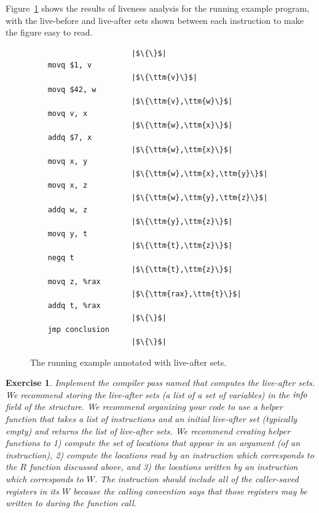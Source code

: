 \documentclass[11pt]{book}
\newtheorem{exercise}[theorem]{Exercise}
\begin{document}
Figure~\ref{fig:live-eg} shows the results of liveness analysis for
the running example program, with the live-before and live-after sets
shown between each instruction to make the figure easy to read.

\begin{figure}[tp]
\hspace{20pt}
\begin{minipage}{0.45\textwidth}
\begin{lstlisting}
                       |$\{\}$|    
    movq $1, v
                       |$\{\ttm{v}\}$|    
    movq $42, w
                       |$\{\ttm{v},\ttm{w}\}$|    
    movq v, x
                       |$\{\ttm{w},\ttm{x}\}$|    
    addq $7, x
                       |$\{\ttm{w},\ttm{x}\}$|    
    movq x, y
                       |$\{\ttm{w},\ttm{x},\ttm{y}\}$|    
    movq x, z
                       |$\{\ttm{w},\ttm{y},\ttm{z}\}$|    
    addq w, z
                       |$\{\ttm{y},\ttm{z}\}$|    
    movq y, t
                       |$\{\ttm{t},\ttm{z}\}$|    
    negq t
                       |$\{\ttm{t},\ttm{z}\}$|    
    movq z, %rax
                       |$\{\ttm{rax},\ttm{t}\}$|    
    addq t, %rax
                       |$\{\}$|
    jmp conclusion
                       |$\{\}$|
\end{lstlisting}
\end{minipage}

\caption{The running example annotated with live-after sets.}
\label{fig:live-eg}
\end{figure}

\begin{exercise}\normalfont
Implement the compiler pass named  that computes
the live-after sets. We recommend storing the live-after sets (a list
of a set of variables) in the $\mathit{info}$ field of the 
structure.
%
We recommend organizing your code to use a helper function that takes
a list of instructions and an initial live-after set (typically empty)
and returns the list of live-after sets.
%
We recommend creating helper functions to 1) compute the set of
locations that appear in an argument (of an instruction), 2) compute
the locations read by an instruction which corresponds to the $R$
function discussed above, and 3) the locations written by an
instruction which corresponds to $W$. The  instruction
should include all of the caller-saved registers in its $W$ because
the calling convention says that those registers may be written to
during the function call.

\end{exercise}
\end{document}
